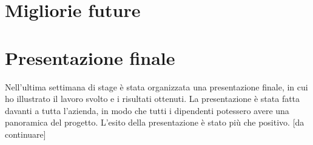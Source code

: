 \section{Migliorie future}
\section{Presentazione finale}
Nell'ultima settimana di stage è stata organizzata una presentazione finale, in cui ho illustrato il lavoro svolto e i risultati ottenuti.
La presentazione è stata fatta davanti a tutta l'azienda, in modo che tutti i dipendenti potessero avere una panoramica del progetto.
L'esito della presentazione è stato più che positivo. [da continuare]








